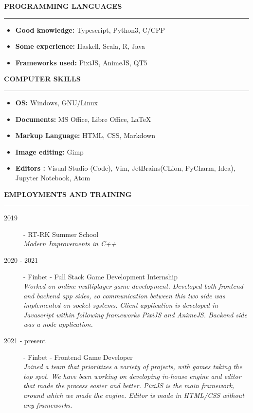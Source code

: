 \documentclass{article}
\begin{document}
\color{my_col}
\textbf{\large PROGRAMMING LANGUAGES}\\
\noindent\rule{15.4cm}{1.6pt}\color{black}
\normalsize
\begin{itemize}
	\item\textbf{Good knowledge: 	} Typescript, Python3, C/CPP
	\item\textbf{Some experience:	} Haskell, Scala, R, Java
	\item\textbf{Frameworks used:} PixiJS, AnimeJS, QT5\\
\end{itemize}
  
\color{my_col}
\textbf{\large COMPUTER SKILLS}\\
\noindent\rule{15.4cm}{1.6pt}\color{black}
\normalsize
   \begin{multicols}{2}
  	\begin{itemize}
  		\item\textbf{OS: 	} Windows, GNU/Linux
  		\item\textbf{Documents:} MS Office, Libre Office, \LaTeX
  		\item\textbf{Markup Language: } HTML, CSS, Markdown\\
  		\item\textbf{Image editing: } Gimp
  		\item\textbf{Editors :} Visual Studio (Code), Vim, JetBrains(CLion, PyCharm, Idea), Jupyter Notebook, Atom\\
 
  	\end{itemize}
  \end{multicols}

\color{my_col}
\textbf{\large EMPLOYMENTS AND TRAINING}\\
\noindent\rule{15.4cm}{1.6pt}\color{black}
\begin{description}
	\item[ 2019] - RT-RK Summer School \\
	\textit{Modern Improvements in C++}\\
	\item[ 2020 - 2021] - Finbet - Full Stack Game Development Internship\\
	\textit{Worked on online multiplayer game development. Developed both frontend and backend app sides, so communication between this two side was implemented on socket systems. Client application is developed in Javascript within following frameworks PixiJS and AnimeJS. Backend side was a node application.}\\
	\item[ 2021 - present ] - Finbet - Frontend Game Developer \\
	\textit{Joined a team that prioritizes a variety of projects, with games taking the top spot. We have been working on developing in-house engine and editor that made the process easier and better. PixiJS is the main framework, around which we made the engine. Editor is made in HTML/CSS without any frameworks.}\\
\end{description}
\end{document}
